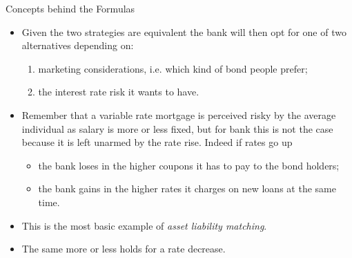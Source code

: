 \documentclass{beamer}
\begin{document}
\begin{frame}{Concepts behind the Formulas}
	\begin{itemize}
		\item<1-> Given the two strategies are equivalent the bank will then opt for one of two alternatives depending on:
		\begin{enumerate}
			\item marketing considerations, i.e. which kind of bond people prefer;
			\item the interest rate risk it wants to have.
		\end{enumerate} 
		\item<2-> Remember that a variable rate mortgage is perceived risky by the average individual as salary is more or less fixed, but for bank this is not the case because it is left unarmed by the rate rise. Indeed if rates go up
		\begin{itemize}
			\item the bank loses in the higher coupons it has to pay to the bond holders;
			\item the bank gains in the higher rates it charges on new loans at the same time.
		\end{itemize}
		\item<3-> This is the most basic example of \emph{asset liability matching}.
		\item<4-> The same more or less holds for a rate decrease.%
	\end{itemize}
\end{frame}
\end{document}
